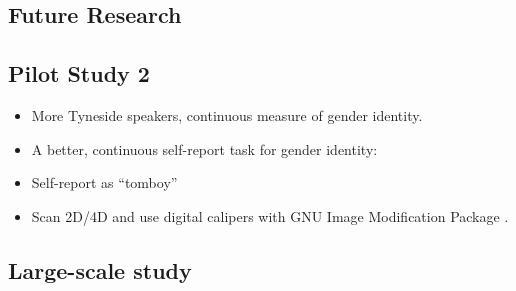 \documentclass[a0,portrait]{a0poster}
\begin{document}
\begin{multicols}{2}
\section*{Future Research}

\subsection*{Pilot Study 2}
\begin{itemize}
\item More Tyneside speakers, continuous measure of gender identity.
\item A better, continuous self-report task for gender identity:
\end{itemize}
\begin{itemize}
\item Self-report as ``tomboy''
\item Scan 2D/4D and use digital calipers with GNU Image Modification Package \citep[][]{allawayetal2009}.
\end{itemize}

\subsection*{Large-scale study}



\end{multicols}
\end{document}
